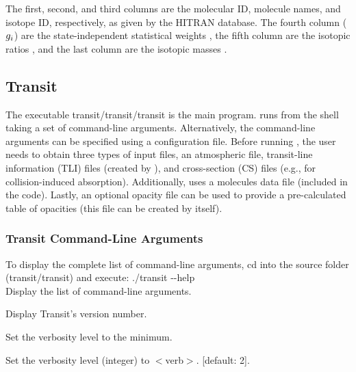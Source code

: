 \documentclass[letterpaper, 12pt]{article}
\begin{document}
The first, second, and third columns are the molecular ID, molecule
names, and isotope ID, respectively, as given by the HITRAN database.
The fourth column ($g\sb{i}$) are the state-independent statistical
weights \citep[from][]{FischerEtal2003jqsrtTIPS}, the fifth column are
the isotopic ratios \citep[from][]{Simeckova2006jqsrtHITRAN}, and the
last column are the isotopic masses \citep[calculated
from][]{Lide2008ChemistryHandbook}.

\subsection{Transit}
\label{sec:input-transit}

The executable {\tttm transit/transit/transit} is the main
{\transit} program.  {\transit} runs from the shell taking a set of
command-line arguments.  Alternatively, the command-line arguments can
be specified using a configuration file.  Before running {\transit},
the user needs to obtain three types of input files, an atmospheric
file, transit-line information (TLI) files (created by {\pylineread}),
and cross-section (CS) files (e.g., for collision-induced absorption).  Additionally,
{\transit} uses a molecules data file (included in the code).  Lastly,
an optional opacity file can be used to provide a pre-calculated table
of opacities (this file can be created by {\transit} itself).

\subsubsection{Transit Command-Line Arguments}
\label{sec:transitCLA}

To display the complete list of command-line arguments, cd into the
{\transit} source folder ({\tttm transit/transit}) and
execute: \newline
{\tttb ./transit {-}{-}help} \\

 \newline
{}
         {Display the list of command-line arguments.}

         {Display Transit's version number.}

         {Set the verbosity level to the minimum.}

         {Set the verbosity level (integer) to $<$verb$>$. [default: 2].}
\end{document}
